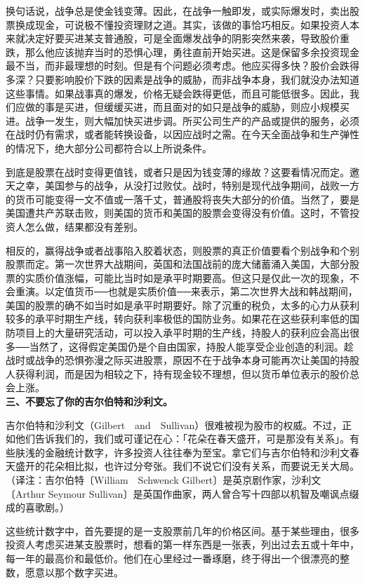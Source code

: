 \documentclass[UTF8,a4paper,zihao=-4,fontset = windows]{ctexart} %
\begin{document}
换句话说，战争总是使金钱变薄。因此，在战争一触即发，或实际爆发时，卖出股票换成现金，可说极不懂投资理财之道。其实，该做的事恰巧相反。如果投资人本来就决定好要买进某支普通股，可是全面爆发战争的阴影突然来袭，导致股价重跌，那么他应该抛弃当时的恐惧心理，勇往直前开始买进。这是保留多余投资现金最不当，而非最理想的时刻。但是有个问题必须考虑。他应买得多快？股价会跌得多深？只要影响股价下跌的因素是战争的威胁，而非战争本身，我们就没办法知道这些事情。如果战事真的爆发，价格无疑会跌得更低，而且可能低很多。因此，我们应做的事是买进，但缓缓买进，而且面对的如只是战争的威胁，则应小规模买进。战争一发生，则大幅加快买进步调。所买公司生产的产品或提供的服务，必须在战时仍有需求，或者能转换设备，以因应战时之需。在今天全面战争和生产弹性的情况下，绝大部分公司都符合以上所说条件。

到底是股票在战时变得更值钱，或者只是因为钱变薄的缘故？这要看情况而定。邀天之幸，美国参与的战争，从没打过败仗。战时，特别是现代战争期间，战败一方的货币可能变得一文不值或一落千丈，普通股将丧失大部分的价值。当然了，要是美国遭共产苏联击败，则美国的货币和美国的股票会变得没有价值。这时，不管投资人怎么做，结果都没有差别。

相反的，赢得战争或者战事陷入胶着状态，则股票的真正价值要看个别战争和个别股票而定。第一次世界大战期间，英国和法国战前的庞大储蓄涌入美国，大部分股票的实质价值涨幅，可能比当时如是承平时期要高。但这只是仅此一次的现象，不会重演。以定值货币──也就是实质价值──来表示，第二次世界大战和韩战期间，美国的股票的确不如当时如是承平时期要好。除了沉重的税负，太多的心力从获利较多的承平时期生产线，转向获利率极低的国防业务。如果花在这些获利率低的国防项目上的大量研究活动，可以投入承平时期的生产线，持股人的获利应会高出很多──当然了，这得假定美国仍是个自由国家，持股人能享受企业创造的利润。趁战时或战争的恐惧弥漫之际买进股票，原因不在于战争本身可能再次让美国的持股人获得利润，而是因为相较之下，持有现金较不理想，但以货币单位表示的股价总会上涨。
\\

\textbf{三、不要忘了你的吉尔伯特和沙利文。}


吉尔伯特和沙利文（Gilbert　and　Sullivan）很难被视为股市的权威。不过，正如他们告诉我们的，我们或可谨记在心：「花朵在春天盛开，可是那没有关系」。有些肤浅的金融统计数字，许多投资人往往奉为至宝。拿它们与吉尔伯特和沙利文春天盛开的花朵相比拟，也许过分夸张。我们不说它们没有关系，而要说无关大局。（译注：吉尔伯特〔William　Schwenck Gilbert〕是英京剧作家，沙利文〔Arthur Seymour Sullivan〕是英国作曲家，两人曾合写十四部以机智及嘲讽点缀成的喜歌剧。）

这些统计数字中，首先要提的是一支股票前几年的价格区间。基于某些理由，很多投资人考虑买进某支股票时，想看的第一样东西是一张表，列出过去五或十年中，每一年的最高价和最低价。他们在心里经过一番琢磨，终于得出一个很漂亮的整数，愿意以那个数字买进。
\end{document}
